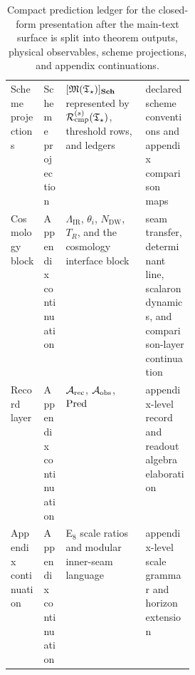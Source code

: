 \begin{table}[t]
\begin{tabularx}{\linewidth}{@{}>{\raggedright\arraybackslash}p{0.18\linewidth}>{\raggedright\arraybackslash}p{0.12\linewidth}YY@{}}
Scheme projections & Scheme projection & $[\mathfrak M(\mathfrak T_{\star})]_{\mathbf{Sch}}$ represented by $\mathcal R_{\mathrm{cmp}}^{(s)}(\mathfrak T_{\star})$, threshold rows, and ledgers & declared scheme conventions and appendix comparison maps \\
Cosmology block & Appendix continuation & $\Lambda_{\mathrm{IR}}$, $\theta_i$, $N_{\mathrm{DW}}$, $T_R$, and the cosmology interface block & seam transfer, determinant line, scalaron dynamics, and comparison-layer continuation \\
Record layer & Appendix continuation & $\mathcal A_{\mathrm{rec}}$, $\mathcal A_{\mathrm{obs}}$, $\operatorname{Pred}$ & appendix-level record and readout algebra elaboration \\
Appendix continuation & Appendix continuation & E$_8$ scale ratios and modular inner-seam language & appendix-level scale grammar and horizon extension \\
\bottomrule
\end{tabularx}
\caption{Compact prediction ledger for the closed-form presentation after the main-text surface is
split into theorem outputs, physical observables, scheme projections, and appendix continuations.}
\label{tab:prediction-ledger}
\end{table}

